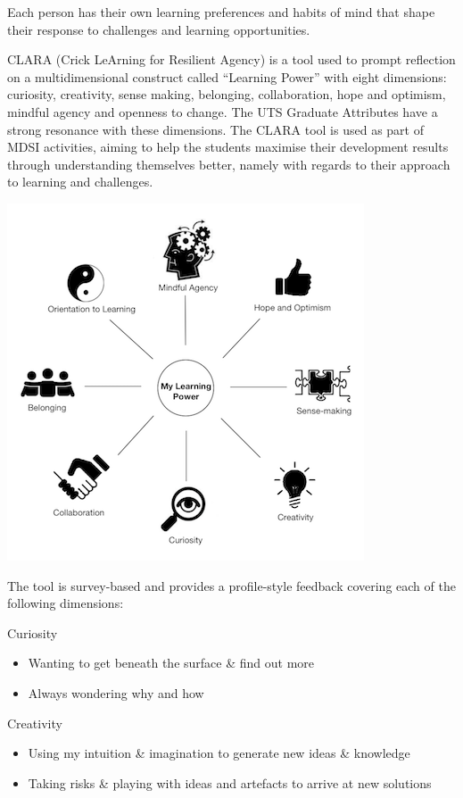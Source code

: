 \documentclass[]{book}
\providecommand{\tightlist}{%
  \setlength{\itemsep}{0pt}\setlength{\parskip}{0pt}}
\theoremstyle{definition}
\theoremstyle{definition}
\theoremstyle{remark}
\begin{document}
Each person has their own learning preferences and habits of mind that
shape their response to challenges and learning opportunities.

CLARA (Crick LeArning for Resilient Agency) is a tool used to prompt
reflection on a multidimensional construct called ``Learning Power''
with eight dimensions: curiosity, creativity, sense making, belonging,
collaboration, hope and optimism, mindful agency and openness to change.
The UTS Graduate Attributes have a strong resonance with these
dimensions. The CLARA tool is used as part of MDSI activities, aiming to
help the students maximise their development results through
understanding themselves better, namely with regards to their approach
to learning and challenges.

\includegraphics{Images/CLARAspider.png}

The tool is survey-based and provides a profile-style feedback covering
each of the following dimensions:

Curiosity

\begin{itemize}
\tightlist
\item
  Wanting to get beneath the surface \& find out more
\item
  Always wondering why and how
\end{itemize}

Creativity

\begin{itemize}
\tightlist
\item
  Using my intuition \& imagination to generate new ideas \& knowledge
\item
  Taking risks \& playing with ideas and artefacts to arrive at new
  solutions
\end{itemize}
\end{document}
